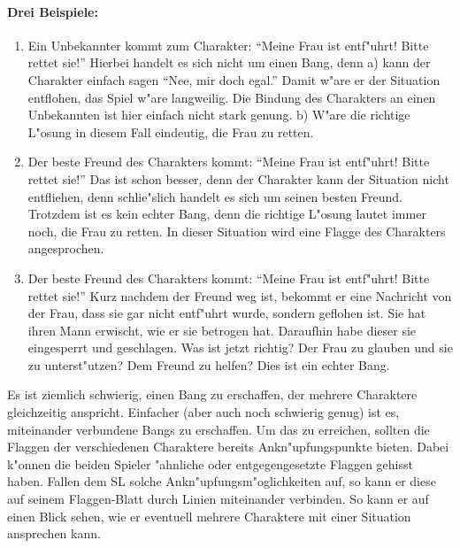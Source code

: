 \begin{beispiel}
  \paragraph{Drei Beispiele:}
  \begin{enumerate}
    \item Ein Unbekannter kommt zum Charakter: ``Meine Frau ist entf"uhrt! Bitte rettet sie!'' Hierbei handelt es sich nicht um einen Bang, denn a) kann der Charakter einfach sagen ``Nee, mir doch egal.'' Damit w"are er der Situation entflohen, das Spiel w"are langweilig. Die Bindung des Charakters an einen Unbekannten ist hier einfach nicht stark genung. b) W"are die richtige L"osung in diesem Fall eindeutig, die Frau zu retten.

    \item Der beste Freund des Charakters kommt: ``Meine Frau ist entf"uhrt! Bitte rettet sie!'' Das ist schon besser, denn der Charakter kann der Situation nicht entfliehen, denn schlie"slich handelt es sich um seinen besten Freund. Trotzdem ist es kein echter Bang, denn die richtige L"osung lautet immer noch, die Frau zu retten. In dieser Situation wird eine Flagge des Charakters angesprochen.

    \item Der beste Freund des Charakters kommt: ``Meine Frau ist entf"uhrt! Bitte rettet sie!'' Kurz nachdem der Freund weg ist, bekommt er eine Nachricht von der Frau, dass sie gar nicht entf"uhrt wurde, sondern geflohen ist. Sie hat ihren Mann erwischt, wie er sie betrogen hat. Daraufhin habe dieser sie eingesperrt und geschlagen. Was ist jetzt richtig? Der Frau zu glauben und sie zu unterst"utzen? Dem Freund zu helfen? Dies ist ein echter Bang.
  \end{enumerate}
\end{beispiel}

Es ist ziemlich schwierig, einen Bang zu erschaffen, der mehrere Charaktere gleichzeitig anspricht. Einfacher (aber auch noch schwierig genug) ist es, miteinander verbundene Bangs zu erschaffen. Um das zu erreichen, sollten die Flaggen der verschiedenen Charaktere bereits Ankn"upfungspunkte bieten. Dabei k"onnen die beiden Spieler "ahnliche oder entgegengesetzte Flaggen gehisst haben. Fallen dem SL solche Ankn"upfungsm"oglichkeiten auf, so kann er diese auf seinem Flaggen-Blatt durch Linien miteinander verbinden. So kann er auf einen Blick sehen, wie er eventuell mehrere Charaktere mit einer Situation ansprechen kann.

